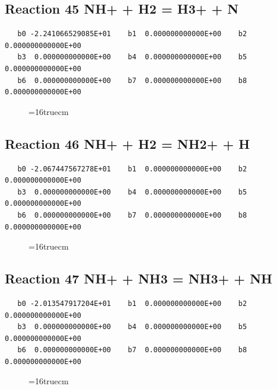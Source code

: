 \documentclass[12pt,dvipdfm]{article}
\begin{document}
\subsection{
Reaction 45 NH+ + H2 = H3+ + N}
\begin{small}\begin{verbatim}
   b0 -2.241066529085E+01    b1  0.000000000000E+00    b2  0.000000000000E+00
   b3  0.000000000000E+00    b4  0.000000000000E+00    b5  0.000000000000E+00
   b6  0.000000000000E+00    b7  0.000000000000E+00    b8  0.000000000000E+00
   \end{verbatim}\end{small}
\begin{figure}[h!]
\label{n2rates}
\epsfxsize=16truecm
\end{figure}
\newpage

\subsection{
Reaction 46 NH+ + H2 = NH2+ + H}
\begin{small}\begin{verbatim}
   b0 -2.067447567278E+01    b1  0.000000000000E+00    b2  0.000000000000E+00
   b3  0.000000000000E+00    b4  0.000000000000E+00    b5  0.000000000000E+00
   b6  0.000000000000E+00    b7  0.000000000000E+00    b8  0.000000000000E+00
   \end{verbatim}\end{small}
\begin{figure}[h!]
\label{n2rates}
\epsfxsize=16truecm
\end{figure}
\newpage

\subsection{
Reaction 47 NH+ + NH3 = NH3+ + NH}
\begin{small}\begin{verbatim}
   b0 -2.013547917204E+01    b1  0.000000000000E+00    b2  0.000000000000E+00
   b3  0.000000000000E+00    b4  0.000000000000E+00    b5  0.000000000000E+00
   b6  0.000000000000E+00    b7  0.000000000000E+00    b8  0.000000000000E+00
   \end{verbatim}\end{small}
\begin{figure}[h!]
\label{n2rates}
\epsfxsize=16truecm
\end{figure}
\newpage
\end{document}
